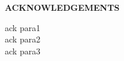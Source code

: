 \thispagestyle{empty}
\begin{center}
\textup{\large{\textbf{ACKNOWLEDGEMENTS}}} \\[0.1in]
\end{center}
\begin{flushleft}
\textup{ack para1} \\[0.1in]
\textup{ack para2} \\[0.1in]
\textup{ack para3} 
\end{flushleft}
\pagebreak